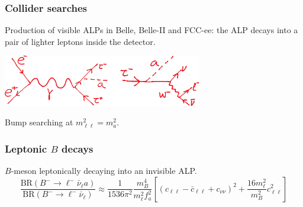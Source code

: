 \documentclass[mathserif, 10pt, aspectratio=169]{beamer}
\begin{document}
\begin{frame}\frametitle{Collider searches}
    Production of visible ALPs in Belle, Belle-II and FCC-ee: the ALP decays into a pair of lighter leptons inside the detector.
    \begin{center}
        \includegraphics[width=0.65\textwidth]{figures/collider.png}
    \end{center}
    Bump searching at $m^2_{\ell\ell} = m_a^2$.
\end{frame}

\begin{frame}\frametitle{Leptonic $B$ decays}

    $B$-meson leptonically decaying into an invisible ALP.
    $$\frac{\mathrm{BR}(B^-\to \ell^- \bar{\nu}_\ell a)}{\mathrm{BR}(B^-\to \ell^- \bar{\nu}_\ell)} \approx \frac{1}{1536\pi^2}\frac{m_B^4}{m_\ell^2 f_a^2}\left[(c_{\ell\ell}-\bar{c}_{\ell\ell}+c_{\nu\nu})^2+\frac{16 m_\ell^2}{m_B^2} c_{\ell\ell}^2\right]$$


\end{frame}
\end{document}
